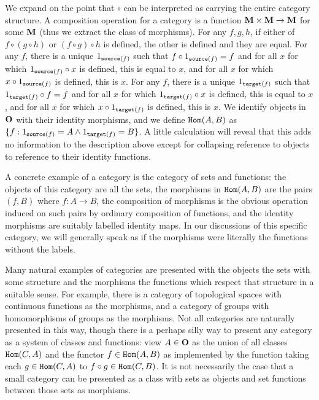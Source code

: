\documentclass[12pt]{article}
\begin{document}
We expand on the point that $\circ$ can be interpreted as carrying the entire category structure.  A composition operation for a category is a function ${\bf M} \times {\bf M} \rightarrow {\bf M}$ for some ${\bf M}$ (thus we extract the class of morphisms).  For any $f,g,h$, if either of $f \circ (g \circ h)$ or $(f \circ g) \circ h$ is defined, the other is defined and they are equal.
For any $f$, there is a unique $1_{{\tt source}(f)}$ such that $f \circ 1_{{\tt source}(f)} = f$ and for all $x$ for which $1_{{\tt source}(f)} \circ x$ is defined, this is equal to $x$, and for all $x$ for which $x \circ 1_{{\tt source}(f)}$ is defined, this is $x$.  For any $f$, there is a unique $1_{{\tt target}(f)}$ such that $1_{{\tt target}(f)} \circ f = f$ and for all $x$ for which $1_{{\tt target}(f)} \circ x$ is defined, this is equal to $x$, and for all $x$ for which $x \circ 1_{{\tt target}(f)}$ is defined, this is $x$.   We identify objects in ${\bf O}$ with their identity morphisms, and we define ${\tt Hom}(A,B)$ as $\{f:1_{{\tt source}(f)} = A \wedge 1_{{\tt target}(f)} = B\}$.  A little calculation will reveal that this adds no information to the description above except for collapsing reference to objects to reference to their identity functions.


A concrete example of a category is the category of sets and functions:  the objects of this category are all the sets, the morphisms in ${\tt Hom}(A,B)$ are the pairs $(f,B)$ where
$f : A \rightarrow B$, the composition of morphisms is the obvious operation induced on such pairs by ordinary composition of functions, and the identity morphisms are suitably labelled identity maps.  In our discussions of this specific category, we will generally speak as if the morphisms were literally the functions without the labels.

Many natural examples of categories are presented with the objects the sets with some structure and the morphisms the functions which respect that structure in a suitable sense.  For example, there is a category of topological spaces with continuous functions as the morphisms, and a category of groups with homomorphisms of groups as the morphisms.
Not all categories are naturally  presented in this way, though there is a perhaps silly way to present any category as a system of classes and functions:  view $A \in {\bf O}$ as the union of all classes ${\tt Hom}(C,A)$ and the functor $f \in {\tt Hom}(A,B)$ as implemented by the function taking each $g \in {\tt Hom}(C,A)$ to $f \circ g \in {\tt Hom}(C,B)$.
It is not necessarily the case that a small category can be presented as a class with sets as objects and set functions between those sets as morphisms.
\end{document}
